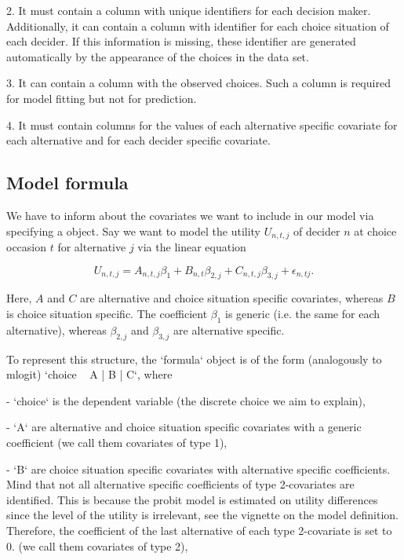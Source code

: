\documentclass[article]{jss}
\begin{document}
2. It must contain a column with unique identifiers for each decision maker. Additionally, it can contain a column with identifier for each choice situation of each decider. If this information is missing, these identifier are generated automatically by the appearance of the choices in the data set.

3. It can contain a column with the observed choices. Such a column is required for model fitting but not for prediction.

4. It must contain columns for the values of each alternative specific covariate for each alternative and for each decider specific covariate.

\subsection{Model formula} \label{subsec:model_formula}

We have to inform  about the covariates we want to include in our model via specifying a  object. Say we want to model the utility $U_{n,t,j}$ of decider $n$ at choice occasion $t$ for alternative $j$ via the linear equation

$$U_{n,t,j} = A_{n,t,j} \beta_1 + B_{n,t} \beta_{2,j} + C_{n,t,j} \beta_{3,j} + \epsilon_{n,tj}.$$

Here, $A$ and $C$ are alternative and choice situation specific covariates, whereas $B$ is choice situation specific. The coefficient $\beta_1$ is generic (i.e. the same for each alternative), whereas $\beta_{2,j}$ and $\beta_{3,j}$ are alternative specific.

To represent this structure, the `formula` object is of the form (analogously to {mlogit}) `choice ~ A | B | C`, where

- `choice` is the dependent variable (the discrete choice we aim to explain),

- `A` are alternative and choice situation specific covariates with a generic coefficient (we call them covariates of type 1),

- `B` are choice situation specific covariates with alternative specific coefficients. Mind that not all alternative specific coefficients of type 2-covariates are identified. This is because the probit model is estimated on utility differences since the level of the utility is irrelevant, see the vignette on the model definition. Therefore, the coefficient of the last alternative of each type 2-covariate is set to 0. (we call them covariates of type 2),
\end{document}
